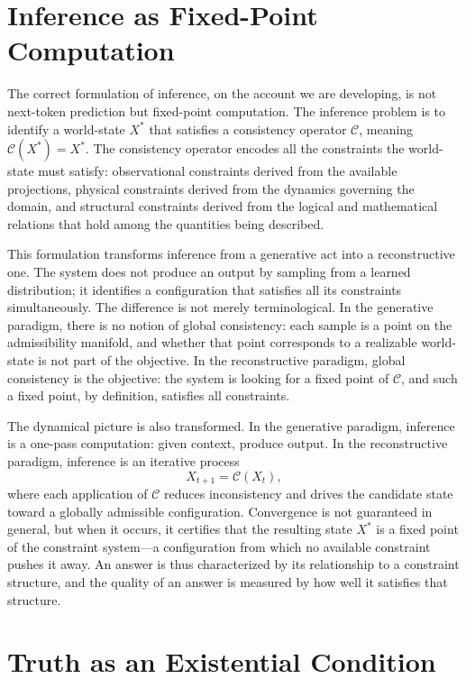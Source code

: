 \documentclass[11pt, oneside]{article}
\begin{document}
\section{Inference as Fixed-Point Computation}

The correct formulation of inference, on the account we are developing, is not next-token prediction but fixed-point computation. The inference problem is to identify a world-state $X^\ast$ that satisfies a consistency operator $\mathcal{C}$, meaning $\mathcal{C}(X^\ast) = X^\ast$. The consistency operator encodes all the constraints the world-state must satisfy: observational constraints derived from the available projections, physical constraints derived from the dynamics governing the domain, and structural constraints derived from the logical and mathematical relations that hold among the quantities being described.

This formulation transforms inference from a generative act into a reconstructive one. The system does not produce an output by sampling from a learned distribution; it identifies a configuration that satisfies all its constraints simultaneously. The difference is not merely terminological. In the generative paradigm, there is no notion of global consistency: each sample is a point on the admissibility manifold, and whether that point corresponds to a realizable world-state is not part of the objective. In the reconstructive paradigm, global consistency is the objective: the system is looking for a fixed point of $\mathcal{C}$, and such a fixed point, by definition, satisfies all constraints.

The dynamical picture is also transformed. In the generative paradigm, inference is a one-pass computation: given context, produce output. In the reconstructive paradigm, inference is an iterative process
\[
X_{t+1} = \mathcal{C}(X_t),
\]
where each application of $\mathcal{C}$ reduces inconsistency and drives the candidate state toward a globally admissible configuration. Convergence is not guaranteed in general, but when it occurs, it certifies that the resulting state $X^\ast$ is a fixed point of the constraint system---a configuration from which no available constraint pushes it away. An answer is thus characterized by its relationship to a constraint structure, and the quality of an answer is measured by how well it satisfies that structure.

\section{Truth as an Existential Condition}
\end{document}
